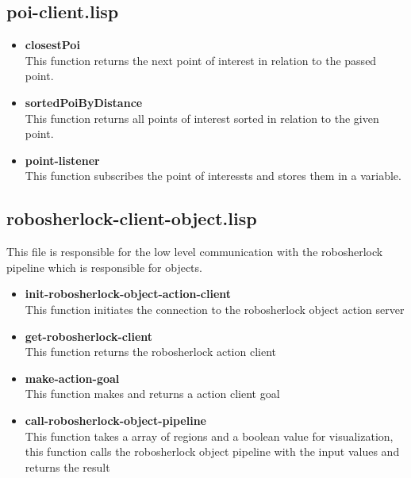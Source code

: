 \documentclass[main.tex]{subfiles}
\begin{document}
		\subsection{poi-client.lisp}
 		\begin{itemize}
	    	\item \textbf{closestPoi} \\
	    	This function returns the next point of interest in relation to the passed point.
	    	\item \textbf{sortedPoiByDistance} \\
	    	This function returns all points of interest sorted in relation to the given point.
	    	\item \textbf{point-listener} \\
	    	This function subscribes the point of interessts and stores them in a variable.
	    \end{itemize}
		\subsection{robosherlock-client-object.lisp}
		This file is responsible for the low level communication with the robosherlock pipeline which is responsible for objects.
		\begin{itemize}
			\item \textbf{init-robosherlock-object-action-client} \\
			This function initiates the connection to the robosherlock object action server
			\item \textbf{get-robosherlock-client} \\
			This function returns the robosherlock action client
			\item \textbf{make-action-goal} \\
			This function makes and returns a action client goal
			\item \textbf{call-robosherlock-object-pipeline} \\
			This function takes a array of regions and a boolean value for visualization, this function calls the robosherlock object pipeline with the input values and returns the result
		\end{itemize}
\end{document}
